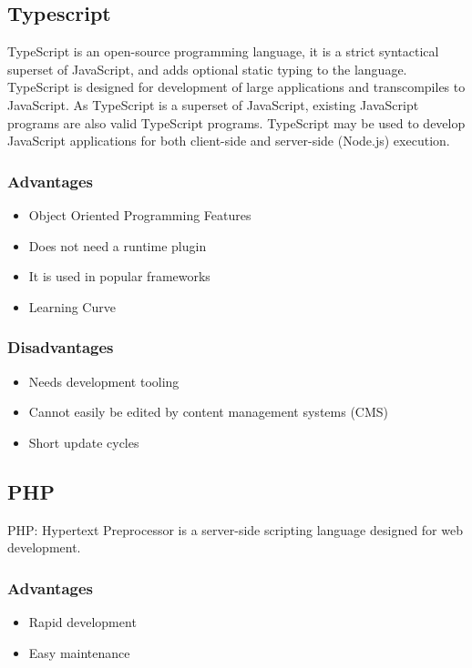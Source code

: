 \documentclass[a4paper, hidelinks, 12pt]{report}
\begin{document}
\subsection{Typescript}
	TypeScript is an open-source programming language, it is a strict syntactical superset of JavaScript, and adds optional static typing to the language. TypeScript is designed for development of large applications and transcompiles to JavaScript. As TypeScript is a superset of JavaScript, existing JavaScript programs are also valid TypeScript programs. TypeScript may be used to develop JavaScript applications for both client-side and server-side (Node.js) execution.

\subsubsection{Advantages}
\begin{itemize}
\item{} Object Oriented Programming Features
\item{} Does not need a runtime plugin
\item{} It is used in popular frameworks
\item{} Learning Curve
\end{itemize}
\subsubsection{Disadvantages}
\begin{itemize}
\item{} Needs development tooling
\item{} Cannot easily be edited by content management systems (CMS)
\item{} Short update cycles
\end{itemize}

\subsection{PHP}
PHP: Hypertext Preprocessor is a server-side scripting language designed for web development.

\subsubsection{Advantages}
\begin{itemize}
\item{} Rapid development
\item{} Easy maintenance
\end{itemize}
\end{document}
